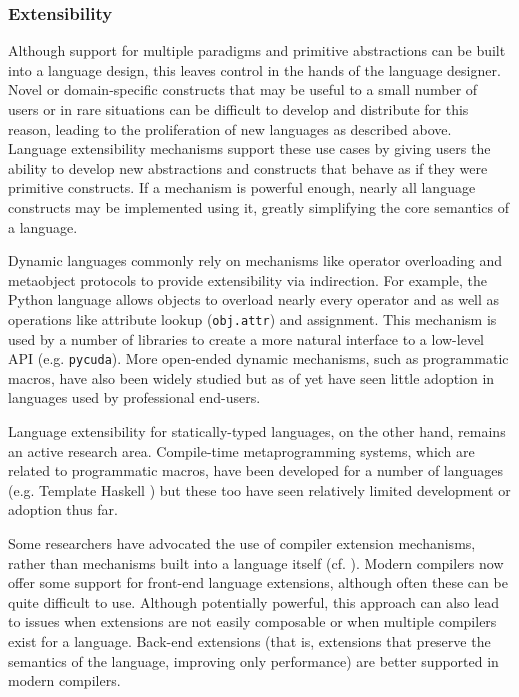 \documentclass[12pt]{article}
\begin{document}
\subsubsection{Extensibility}\label{extensions}

Although support for multiple paradigms and primitive abstractions can be built into a language design, this leaves control in the hands of the language designer. Novel or domain-specific constructs that may be useful to a small number of users or in rare situations can be difficult to develop and distribute for this reason, leading to the proliferation of new languages as  described above. Language extensibility mechanisms support these use cases by giving users the ability to develop new abstractions and constructs that behave as if they were primitive constructs. If a mechanism is powerful enough, nearly all language constructs may be implemented using it, greatly simplifying the core semantics of a language.

Dynamic languages commonly rely on mechanisms like operator overloading and metaobject protocols \cite{Kiczales91} to provide extensibility via indirection. For example, the Python language allows objects to overload nearly every operator and as well as operations like attribute lookup (\verb|obj.attr|) and assignment. This mechanism is used by a number of libraries to create a more natural interface to a low-level API (e.g. \verb|pycuda|). More open-ended dynamic mechanisms, such as programmatic macros, have also been widely studied but as of yet have seen little adoption in languages used by professional end-users. 

Language extensibility for statically-typed languages, on the other hand, remains an active research area. Compile-time metaprogramming systems, which are related to programmatic macros, have been developed for a number of languages (e.g. Template Haskell \cite{sheard2002template}) but these too have seen relatively limited development or adoption thus far.

Some researchers have advocated the use of compiler extension mechanisms, rather than mechanisms built into a language itself (cf. \cite{clements2008comparison}). Modern compilers now offer some support for front-end language extensions, although often these  can be quite difficult to use.  Although potentially powerful, this approach can also lead to issues when extensions are not easily composable or when multiple compilers exist for a language. Back-end extensions (that is, extensions that preserve the semantics of the language, improving only performance) are better supported in modern compilers.
\end{document}
